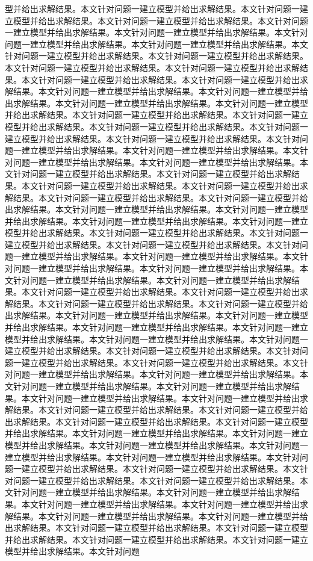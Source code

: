 型并给出求解结果。本文针对问题一建立模型并给出求解结果。本文针对问题一建立模型并给出求解结果。本文针对问题一建立模型并给出求解结果。本文针对问题一建立模型并给出求解结果。本文针对问题一建立模型并给出求解结果。本文针对问题一建立模型并给出求解结果。本文针对问题一建立模型并给出求解结果。本文针对问题一建立模型并给出求解结果。本文针对问题一建立模型并给出求解结果。本文针对问题一建立模型并给出求解结果。本文针对问题一建立模型并给出求解结果。本文针对问题一建立模型并给出求解结果。本文针对问题一建立模型并给出求解结果。本文针对问题一建立模型并给出求解结果。本文针对问题一建立模型并给出求解结果。本文针对问题一建立模型并给出求解结果。本文针对问题一建立模型并给出求解结果。本文针对问题一建立模型并给出求解结果。本文针对问题一建立模型并给出求解结果。本文针对问题一建立模型并给出求解结果。本文针对问题一建立模型并给出求解结果。本文针对问题一建立模型并给出求解结果。本文针对问题一建立模型并给出求解结果。本文针对问题一建立模型并给出求解结果。本文针对问题一建立模型并给出求解结果。本文针对问题一建立模型并给出求解结果。本文针对问题一建立模型并给出求解结果。本文针对问题一建立模型并给出求解结果。本文针对问题一建立模型并给出求解结果。本文针对问题一建立模型并给出求解结果。本文针对问题一建立模型并给出求解结果。本文针对问题一建立模型并给出求解结果。本文针对问题一建立模型并给出求解结果。本文针对问题一建立模型并给出求解结果。本文针对问题一建立模型并给出求解结果。本文针对问题一建立模型并给出求解结果。本文针对问题一建立模型并给出求解结果。本文针对问题一建立模型并给出求解结果。本文针对问题一建立模型并给出求解结果。本文针对问题一建立模型并给出求解结果。本文针对问题一建立模型并给出求解结果。本文针对问题一建立模型并给出求解结果。本文针对问题一建立模型并给出求解结果。本文针对问题一建立模型并给出求解结果。本文针对问题一建立模型并给出求解结果。本文针对问题一建立模型并给出求解结果。本文针对问题一建立模型并给出求解结果。本文针对问题一建立模型并给出求解结果。本文针对问题一建立模型并给出求解结果。本文针对问题一建立模型并给出求解结果。本文针对问题一建立模型并给出求解结果。本文针对问题一建立模型并给出求解结果。本文针对问题一建立模型并给出求解结果。本文针对问题一建立模型并给出求解结果。本文针对问题一建立模型并给出求解结果。本文针对问题一建立模型并给出求解结果。本文针对问题一建立模型并给出求解结果。本文针对问题一建立模型并给出求解结果。本文针对问题一建立模型并给出求解结果。本文针对问题一建立模型并给出求解结果。本文针对问题一建立模型并给出求解结果。本文针对问题一建立模型并给出求解结果。本文针对问题一建立模型并给出求解结果。本文针对问题一建立模型并给出求解结果。本文针对问题一建立模型并给出求解结果。本文针对问题一建立模型并给出求解结果。本文针对问题一建立模型并给出求解结果。本文针对问题一建立模型并给出求解结果。本文针对问题一建立模型并给出求解结果。本文针对问题一建立模型并给出求解结果。本文针对问题一建立模型并给出求解结果。本文针对问题一建立模型并给出求解结果。本文针对问题一建立模型并给出求解结果。本文针对问题一建立模型并给出求解结果。本文针对问题一建立模型并给出求解结果。本文针对问题一建立模型并给出求解结果。本文针对问题一建立模型并给出求解结果。本文针对问题一建立模型并给出求解结果。本文针对问题一建立模型并给出求解结果。本文针对问题一建立模型并给出求解结果。本文针对问题一建立模型并给出求解结果。本文针对问题一建立模型并给出求解结果。本文针对问题一建立模型并给出求解结果。本文针对问题一建立模型并给出求解结果。本文针对问题一建立模型并给出求解结果。本文针对问题一建立模型并给出求解结果。本文针对问题一建立模型并给出求解结果。本文针对问题